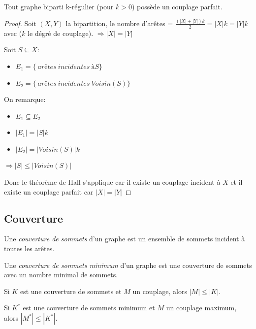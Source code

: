 \begin{mycorr}
  Tout graphe biparti k-régulier (pour $k > 0$) possède un couplage parfait.
  \begin{proof}
  Soit $(X,Y)$ la bipartition, le nombre d'arêtes = $\frac{(|X| + |Y|) k}{2} = |X| k = |Y| k$ avec ($k$ le dégré de couplage). $\Rightarrow |X| = |Y|$

  Soit $S \subseteq X$:
  \begin{itemize}
   \item $E_{1} = \lbrace \ arêtes\ incidentes\ à S \rbrace$
   \item $E_{2} = \lbrace \ arêtes\ incidentes\ Voisin(S) \rbrace$
   \end{itemize}

  On remarque:
  \begin{itemize}
  \item $E_{1} \subseteq E_{2}$
  \item $|E_{1}| = |S| k$
  \item $|E_{2}| = |Voisin(S)| k$
  \end{itemize}
  $\Rightarrow |S| \leq |Voisin(S)|$

  Donc le théorème de Hall s'applique car il existe un couplage incident à $X$ et il existe un couplage parfait car $|X|=|Y|$
  \end{proof}
\end{mycorr}

\subsection{Couverture}
\begin{mydef}
  Une \emph{couverture de sommets} d’un graphe est un ensemble de sommets incident à toutes les arêtes.
\end{mydef}

\begin{mydef}
  Une \emph{couverture de sommets minimum} d’un graphe est une couverture de sommets avec un nombre minimal de sommets.
\end{mydef}

\begin{myrem}
  Si $K$ est une couverture de sommets et $M$ un couplage, alors $|M| \leq |K|$.
\end{myrem}

\begin{myrem}
  Si $K^*$ est une couverture de sommets minimum et $M$ un couplage maximum, alors $|M^*| \leq |K^*|$.
\end{myrem}

